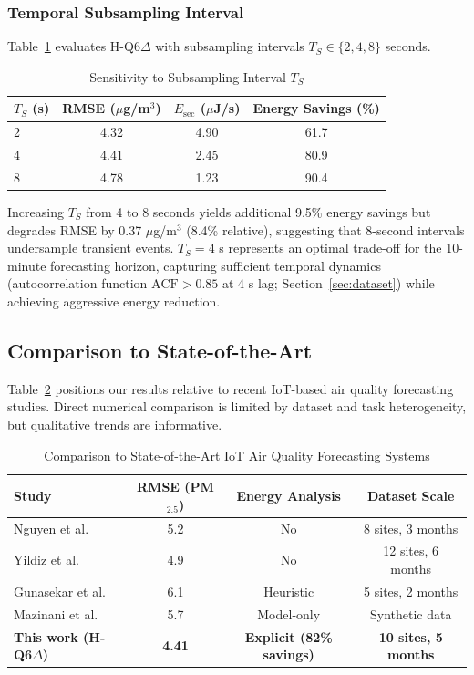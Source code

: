 \subsubsection{Temporal Subsampling Interval}

Table~\ref{tab:sensitivity_ts} evaluates H-Q6$\Delta$ with subsampling intervals $T_S \in \{2, 4, 8\}$ seconds.

\begin{table}[h]
\centering
\caption{Sensitivity to Subsampling Interval $T_S$}
\label{tab:sensitivity_ts}
\begin{tabular}{lccc}
\toprule
\textbf{$T_S$ (s)} & \textbf{RMSE ($\mu$g/m$^3$)} & \textbf{$E_{\text{sec}}$ ($\mu$J/s)} & \textbf{Energy Savings (\%)} \\
\midrule
2 & 4.32 & 4.90 & 61.7 \\
4 & 4.41 & 2.45 & 80.9 \\
8 & 4.78 & 1.23 & 90.4 \\
\bottomrule
\end{tabular}
\end{table}

Increasing $T_S$ from 4 to 8 seconds yields additional 9.5\% energy savings but degrades RMSE by 0.37 $\mu$g/m$^3$ (8.4\% relative), suggesting that 8-second intervals undersample transient events. $T_S = 4$ s represents an optimal trade-off for the 10-minute forecasting horizon, capturing sufficient temporal dynamics (autocorrelation function $\text{ACF} > 0.85$ at 4 s lag; Section~\ref{sec:dataset}) while achieving aggressive energy reduction.

\subsection{Comparison to State-of-the-Art}

Table~\ref{tab:sota_comparison} positions our results relative to recent IoT-based air quality forecasting studies. Direct numerical comparison is limited by dataset and task heterogeneity, but qualitative trends are informative.

\begin{table}[h]
\centering
\caption{Comparison to State-of-the-Art IoT Air Quality Forecasting Systems}
\label{tab:sota_comparison}
\begin{tabular}{lccc}
\toprule
\textbf{Study} & \textbf{RMSE (PM$_{2.5}$)} & \textbf{Energy Analysis} & \textbf{Dataset Scale} \\
\midrule
Nguyen et al. \cite{nguyen2025aiot} & 5.2 & No & 8 sites, 3 months \\
Yildiz et al. \cite{yildiz2025development} & 4.9 & No & 12 sites, 6 months \\
Gunasekar et al. \cite{gunasekar2025power} & 6.1 & Heuristic & 5 sites, 2 months \\
Mazinani et al. \cite{mazinani2025air} & 5.7 & Model-only & Synthetic data \\
\midrule
\textbf{This work (H-Q6$\Delta$)} & \textbf{4.41} & \textbf{Explicit (82\% savings)} & \textbf{10 sites, 5 months} \\
\bottomrule
\end{tabular}
\end{table}


